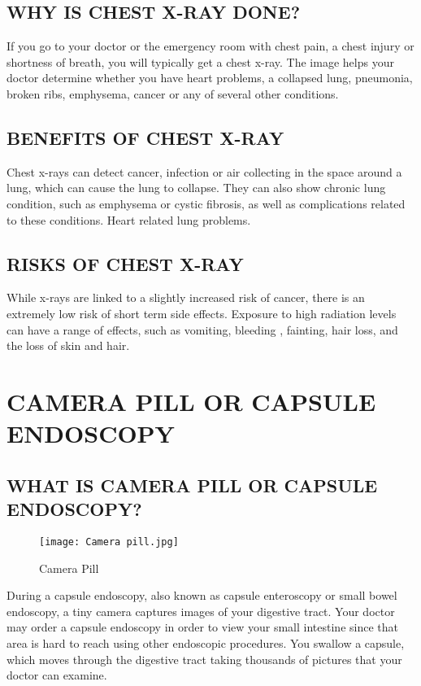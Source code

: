 \documentclass[12pt]{article}
\begin{document}
\subsection{WHY IS CHEST X-RAY DONE?}

{\large If you go to your doctor or the emergency room with chest pain, a chest injury or shortness of breath, you will typically get a chest x-ray. The image helps your doctor determine whether you have heart problems, a collapsed lung, pneumonia, broken ribs, emphysema, cancer or any of several other conditions.}



\subsection{BENEFITS OF CHEST X-RAY}



{\large Chest x-rays can detect cancer, infection or air collecting in the space around a lung, which can cause the lung to collapse. They can also show chronic lung condition, such as emphysema or cystic fibrosis, as  well as complications related to these conditions. Heart related lung problems.}



\subsection{RISKS OF CHEST X-RAY}


{\large While x-rays are linked to a slightly increased risk of cancer, there is an extremely low risk of short term side effects. Exposure to high radiation levels can have a range of effects, such as vomiting, bleeding , fainting, hair loss, and the loss of skin and hair.}


\section{CAMERA PILL OR CAPSULE ENDOSCOPY}

\subsection{WHAT IS CAMERA PILL OR CAPSULE ENDOSCOPY?}


\begin{figure}[h]
\centering
\texttt{[image: Camera pill.jpg]}
\caption{Camera Pill}
\end{figure}


{\large During a capsule endoscopy, also known as capsule enteroscopy or small bowel endoscopy, a tiny camera captures images of your digestive tract. Your doctor may order a capsule endoscopy in order to view your small intestine since that area is hard to reach using other endoscopic procedures. You swallow a capsule, which moves through the digestive tract taking thousands of pictures that your doctor can examine.}
\end{document}
